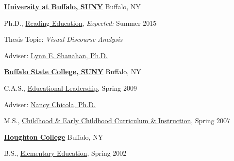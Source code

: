 \href{http://www.buffalo.edu/}{\textbf{University at Buffalo, SUNY}}
Buffalo, NY
\begin{outerlist}

\item[] Ph.D.,
        \href{http://gse.buffalo.edu/lai/doc}
             {Reading Education},
             \emph{Expected:} Summer 2015
        \begin{innerlist}
        \item Thesis Topic: \emph{Visual Discourse Analysis}
        \item Adviser:
              \href{http://gse.buffalo.edu/about/directory/faculty/2110}
                   {Lynn E. Shanahan, Ph.D.}
        \end{innerlist}
\end{outerlist}
\vspace{.1in}

\href{http://www.buffalostate.edu/}{\textbf{Buffalo State College, SUNY}}
Buffalo, NY
\begin{outerlist}

\item[] C.A.S.,
        \href{http://www.buffalostate.edu/gradprog.xml?bpid=27}
             {Educational Leadership},
             Spring 2009
        \begin{innerlist}
        \item Adviser:
              \href{http://elementaryeducation.buffalostate.edu/faculty/nancy-chicola}
                   {Nancy Chicola, Ph.D.}
        \end{innerlist}
\end{outerlist}
\vspace{.1in}

\begin{outerlist}

\item[] M.S.,
        \href{http://www.buffalostate.edu/gradprog.xml?bpid=27}
             {Childhood \& Early Childhood Curriculum \& Instruction},
             Spring 2007
\end{outerlist}
\vspace{.1in}

\href{http://www.houghton.edu/}{\textbf{Houghton College}}
Buffalo, NY
\begin{outerlist}

\item[] B.S.,
        \href{http://www.houghton.edu/education/}
             {Elementary Education},
             Spring 2002
\end{outerlist}
\vspace{.1in}


